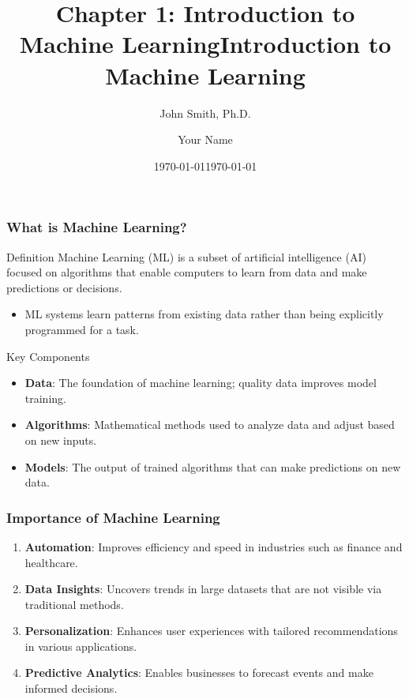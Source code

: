 \documentclass[aspectratio=169]{beamer}
\title[Machine Learning Intro]{Chapter 1: Introduction to Machine Learning}
\author[J. Smith]{John Smith, Ph.D.}
\institute[University Name]{
  Department of Computer Science\\
  University Name\\
  \vspace{0.3cm}
  Email: email@university.edu\\
  Website: www.university.edu
}
\date{\today}
\begin{document}
\frame{\titlepage}

\begin{frame}[fragile]
    \title{Introduction to Machine Learning}
    \author{Your Name}
    \date{\today}
    \maketitle
\end{frame}

\begin{frame}[fragile]
    \frametitle{What is Machine Learning?}
    \begin{block}{Definition}
        Machine Learning (ML) is a subset of artificial intelligence (AI) focused on algorithms that enable computers to learn from data and make predictions or decisions.
    \end{block}

    \begin{itemize}
        \item ML systems learn patterns from existing data rather than being explicitly programmed for a task.
    \end{itemize}
    
    \begin{block}{Key Components}
        \begin{itemize}
            \item \textbf{Data}: The foundation of machine learning; quality data improves model training.
            \item \textbf{Algorithms}: Mathematical methods used to analyze data and adjust based on new inputs.
            \item \textbf{Models}: The output of trained algorithms that can make predictions on new data.
        \end{itemize}
    \end{block}
\end{frame}

\begin{frame}[fragile]
    \frametitle{Importance of Machine Learning}
    \begin{enumerate}
        \item \textbf{Automation}: Improves efficiency and speed in industries such as finance and healthcare.
        \item \textbf{Data Insights}: Uncovers trends in large datasets that are not visible via traditional methods.
        \item \textbf{Personalization}: Enhances user experiences with tailored recommendations in various applications.
        \item \textbf{Predictive Analytics}: Enables businesses to forecast events and make informed decisions.
    \end{enumerate}
\end{frame}
\end{document}

